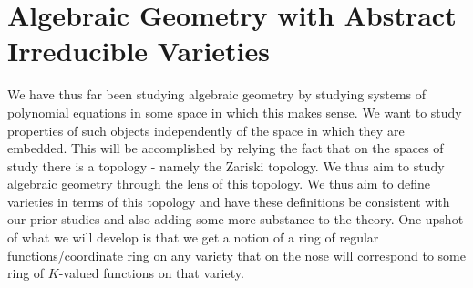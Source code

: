 \section{Algebraic Geometry with Abstract Irreducible Varieties}
We have thus far been studying algebraic geometry by studying systems of polynomial equations in some space in which this makes sense. We want to study properties of such objects independently of the space in which they are embedded. This will be accomplished by relying the fact that on the spaces of study there is a topology - namely the Zariski topology. We thus aim to study algebraic geometry through the lens of this topology. We thus aim to define varieties in terms of this topology and have these definitions be consistent with our prior studies and also adding some more substance to the theory. One upshot of what we will develop is that we get a notion of a ring of regular functions/coordinate ring on any variety that on the nose will correspond to some ring of $K$-valued functions on that variety.  
